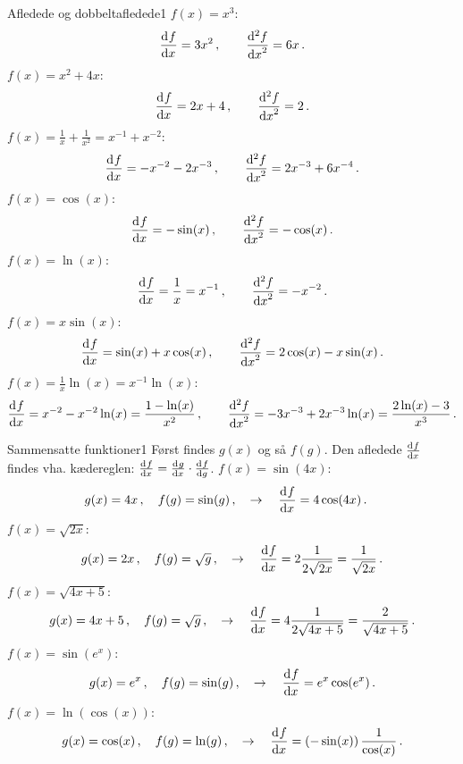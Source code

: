 \begin{opgave}{Afledede og dobbeltafledede}{1}
	\opg $f(x) = x^3$: 
	\begin{equation*}
	\dif{x}{f}=3x^2 \, , \qquad \dif[2]{x}{f}=6x \, .
	\end{equation*}
	\opg $f(x) = x^2 + 4x$:
	\begin{equation*}
	\dif{x}{f}=2x+4 \, , \qquad \dif[2]{x}{f}=2 \, .
	\end{equation*}
	\opg $f(x) = \frac{1}{x} + \frac{1}{x^2}=x^{-1}+x^{-2}$: 
	\begin{equation*}
	\dif{x}{f} = - x^{-2}-2x^{-3} \, , \qquad\dif[2]{x}{f}=2x^{-3}+6x^{-4} \, .
	\end{equation*}
	\opg $f(x) = \cos (x)$: 
	\begin{equation*}
	\dif{x}{f}= - \sin (x) \, , \qquad \dif[2]{x}{f}=-\cos (x) \, .
	\end{equation*}
	\opg $f(x) = \ln (x)$: 
	\begin{equation*}
	\dif{x}{f}= \frac{1}{x}=x^{-1} \, , \qquad \dif[2]{x}{f}=-x^{-2} \, .
	\end{equation*}
	\opg $f(x) = x\sin(x)$:
	\begin{equation*}
	\dif{x}{f} = \sin(x)+x\cos(x) \, , \qquad \dif[2]{x}{f} = 2\cos(x) - x\sin(x) \, .
	\end{equation*} 
	\opg $f(x) = \frac{1}{x}\ln(x) = x^{-1} \ln(x)$:
	\begin{equation*}
	\dif{x}{f} =  x^{-2} - x^{-2} \ln(x) = \frac{1 - \ln(x)}{x^2} \, , \qquad \dif[2]{x}{f} = -3x^{-3} + 2x^{-3}\ln(x) = \frac{2\ln(x) - 3}{x^3} \, .
	\end{equation*}
\end{opgave}
\begin{opgave}{Sammensatte funktioner}{1}
	Først findes $g(x)$ og så $f(g)$. Den afledede $\dif{x}{f}$ findes vha. kædereglen: $\dif{x}{f} = \dif{x}{g} \cdot \dif{g}{f}$.
	\opg $f(x) = \sin (4x)$:
	\begin{align*}
	g(x) &= 4x \, , \quad f(g)=\sin(g) \, , \quad \rightarrow \quad \dif{x}{f} = 4\cos(4x) \, .
	\end{align*}
	\opg $f(x) = \sqrt{2x}$:
	\begin{align*}
	g(x) = 2x \, , \quad f(g)=\sqrt{g} \, , \quad \rightarrow \quad \dif{x}{f} = 2\frac{1}{2\sqrt{2x}}=\frac{1}{\sqrt{2x}} \, .
	\end{align*}
	\opg $f(x) = \sqrt{4x+5}$:
	\begin{align*}
	g(x) = 4x+5 \, , \quad f(g)=\sqrt{g} \, , \quad \rightarrow \quad \dif{x}{f} = 4\frac{1}{2\sqrt{4x+5}}=\frac{2}{\sqrt{4x+5}} \, .
	\end{align*}
	\opg $f(x) = \sin(e^x)$:
	\begin{align*}
	g(x) = e^x \, , \quad f(g)=\sin(g) \, , \quad \rightarrow \quad \dif{x}{f} = e^x \cos(e^x) \, .
	\end{align*}
	\opg $f(x)=\ln(\cos(x))$:
	\begin{align*}
	g(x) = \cos(x) \, , \quad f(g) = \ln(g) \, , \quad
	\rightarrow \quad \dif{x}{f} = \left(-\sin(x)\right) \frac{1}{\cos(x)} \, .
	\end{align*}
\end{opgave}
